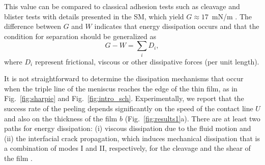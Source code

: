 \documentclass[10pt,twocolumn]{article}
\begin{document}
This value can be compared to classical adhesion tests such as cleavage and blister tests with details presented in the SM, which yield $G \approx 17$~mN/m \cite{Kendall1994,Boulogne2017b}.
The difference between $G$ and $W$ indicates that energy dissipation occurs and that the condition for separation should be generalized as
\begin{equation}\label{eq:Kendall2}
    G-W = \sum_i D_i,
\end{equation}
where $D_i$ represent frictional, viscous or other dissipative forces (per unit length).

It is not straightforward to determine the dissipation mechanisms that occur when the triple line of the meniscus reaches the edge of the thin film, as in Fig.~\ref{fig:sharpie} and Fig.~\ref{fig:intro_sch}.
Experimentally, we report that the success rate of the peeling depends significantly on the speed of the contact line $U$ and also on the thickness of the film $b$ (Fig.~\ref{fig:results1}a).
There are at least two paths for energy dissipation: (i) viscous dissipation due to the fluid motion and (ii) the interfacial crack propagation, which induces mechanical dissipation that is a combination of modes I and II, respectively, for the cleavage and the shear of the film \cite{Hutchinson1991}.
\end{document}
